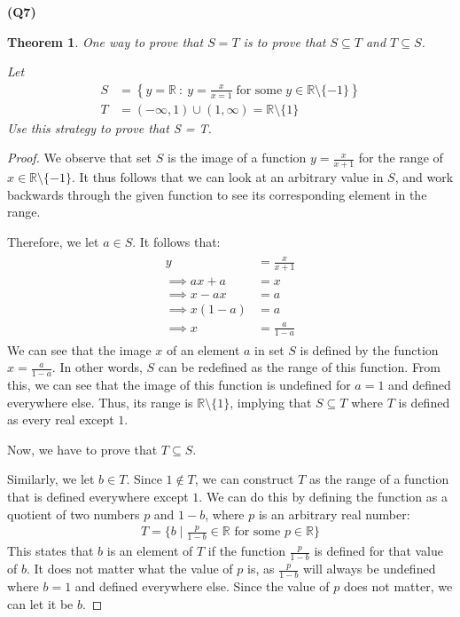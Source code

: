 \documentclass[12pt, a4paper]{article}
\newcommand{\R}{\mathbb{R}}
\newcommand{\open}[1]{\left(#1\right)}
\newcommand{\set}[2]{\left\{#1 \:\colon\: #2\right\}}
\newtheorem{theorem}{Theorem}
\begin{document}
\noindent\textbf{(Q7)}
\begin{theorem}
    One way to prove that $S = T$ is to prove that $S \subseteq T$ and $T \subseteq S$.

    Let
    \begin{align*}
        S & = \set{y = \R}{y = \frac{x}{x = 1}\;\text{for some}\;y \in \R \setminus \{-1\}}\\
        T & = \open{-\infty, 1} \cup \open{1, \infty} = \R \setminus \{1\}
    \end{align*}
    Use this strategy to prove that S = T.
\end{theorem}

\begin{proof}
    We observe that set $S$ is the image of a function $y = \tfrac{x}{x + 1}$ for the range
    of $x \in \R \setminus \{-1\}$. It thus follows that we can look at an arbitrary value
    in $S$, and work backwards through the given function to see its corresponding element
    in the range.

    Therefore, we let $a \in S$. It follows that:
    \[
    \begin{gathered}
        \begin{aligned}
            y & = \frac{x}{x + 1}\\
            \implies ax + a & = x\\
            \implies x - ax & = a\\
            \implies x(1-a) & = a\\
            \implies x & = \frac{a}{1 -a}
        \end{aligned}
    \end{gathered}
    \]
    We can see that the image $x$ of an element $a$ in set $S$ is defined by the function
    $x = \tfrac{a}{1 - a}$. In other words, $S$ can be redefined as the range of this 
    function. From this, we can see that the image of this function is undefined for 
    $a = 1$ and defined everywhere else. Thus, its range is $\R \setminus \{1\}$, 
    implying that $S \subseteq T$ where $T$ is defined as every real except $1$.

    Now, we have to prove that $T \subseteq S$.

    Similarly, we let $b \in T$. Since $1 \notin T$, we can construct $T$ as the range of
    a function that is defined everywhere except $1$. We can do this by defining the function
    as a quotient of two numbers $p$ and $1 - b$, where $p$ is an arbitrary real number:
    \begin{align*} 
        T = \{b \mid \frac{p}{1-b} \in \R \text{ for some } p \in \R\}
    \end{align*}
    This states that $b$ is an element of $T$ if the function $\tfrac{p}{1-b}$ is defined for
    that value of $b$.
    It does not matter what the value of $p$ is, as $\tfrac{p}{1-b}$ will always be undefined 
    where $b = 1$ and defined everywhere else. Since the value of $p$ does not matter, we can 
    let it be $b$.


\end{proof}
\end{document}
